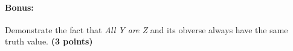 \documentclass[10pt]{article}
\begin{document}
\paragraph{Bonus:}  Demonstrate the fact that \textit{All Y are Z} and its obverse always have the same truth value. \textbf{(3 points)}
\end{document}
